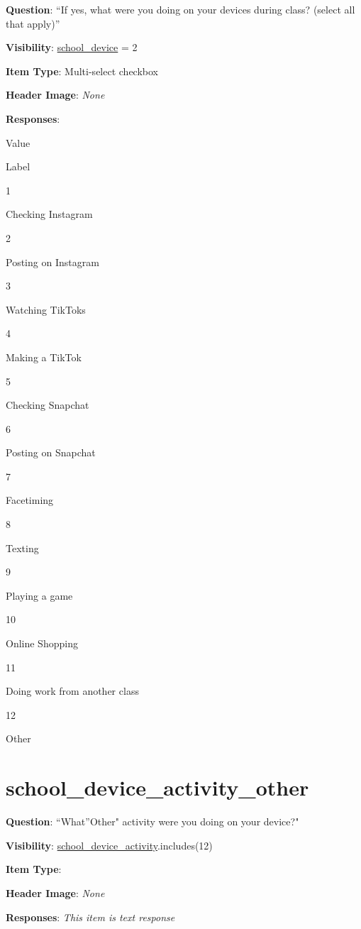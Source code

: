 \documentclass[]{book}
\begin{document}
\textbf{Question}: ``If yes, what were you doing on your devices during class? (select all that apply)''

\textbf{Visibility}: \protect\hyperlink{school_device}{school\_device} = 2

\textbf{Item Type}: Multi-select checkbox

\textbf{Header Image}: \emph{None}

\textbf{Responses}:

Value

Label

1

Checking Instagram

2

Posting on Instagram

3

Watching TikToks

4

Making a TikTok

5

Checking Snapchat

6

Posting on Snapchat

7

Facetiming

8

Texting

9

Playing a game

10

Online Shopping

11

Doing work from another class

12

Other

\hypertarget{school_device_activity_other}{%
\section{school\_device\_activity\_other}\label{school_device_activity_other}}

\textbf{Question}: ``What''Other" activity were you doing on your device?"

\textbf{Visibility}: \protect\hyperlink{school_device_activity}{school\_device\_activity}.includes(12)

\textbf{Item Type}:

\textbf{Header Image}: \emph{None}

\textbf{Responses}: \emph{This item is text response}
\end{document}
